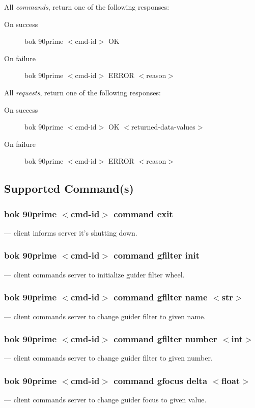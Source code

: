 \documentclass[12pt,twoside]{article}
\begin{document}
\noindent All \emph{commands}, return one of the following responses:

 \begin{description}
  \item[On success] bok 90prime $<$cmd-id$>$ OK
  \item[On failure] bok 90prime $<$cmd-id$>$ ERROR $<$reason$>$
 \end{description}

\noindent All \emph{requests}, return one of the following responses:

 \begin{description}
  \item[On success] bok 90prime $<$cmd-id$>$ OK $<$returned-data-values$>$
  \item[On failure] bok 90prime $<$cmd-id$>$ ERROR $<$reason$>$
 \end{description}

\subsection{Supported Command(s)}

\subsubsection{bok 90prime $<$cmd-id$>$ command exit}
  --- client informs server it's shutting down.

\subsubsection{bok 90prime $<$cmd-id$>$ command gfilter init}
  --- client commands server to initialize guider filter wheel.
 
\subsubsection{bok 90prime $<$cmd-id$>$ command gfilter name $<$str$>$}
  --- client commands server to change guider filter to given name.
 
\subsubsection{bok 90prime $<$cmd-id$>$ command gfilter number $<$int$>$}
  --- client commands server to change guider filter to given number.
 
\subsubsection{bok 90prime $<$cmd-id$>$ command gfocus delta $<$float$>$}
  --- client commands server to change guider focus to given value.
\end{document}
